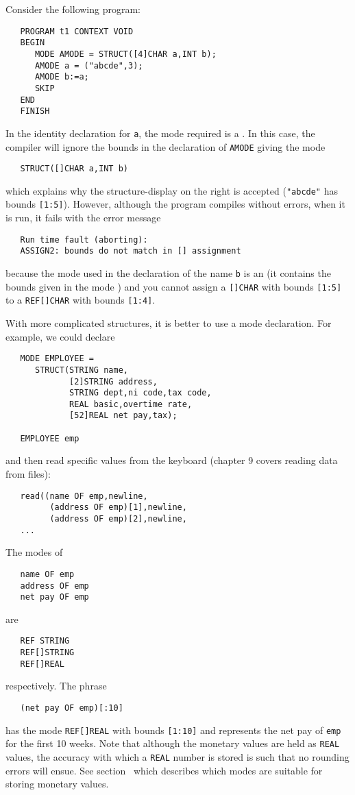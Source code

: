 Consider the following program:
\begin{verbatim}
   PROGRAM t1 CONTEXT VOID
   BEGIN
      MODE AMODE = STRUCT([4]CHAR a,INT b);
      AMODE a = ("abcde",3);
      AMODE b:=a;
      SKIP
   END
   FINISH
\end{verbatim}
\noindent
In the identity declaration for \verb|a|, the mode required is a
.  In this case, the
compiler will ignore the bounds in the declaration of \verb|AMODE|
giving the mode
\begin{verbatim}
   STRUCT([]CHAR a,INT b)
\end{verbatim}
\noindent
which explains why the structure-display on the right is accepted
(\verb|"abcde"| has bounds \verb|[1:5]|). However, although the
program compiles without errors, when it is run, it fails with the
error message
\begin{verbatim}
   Run time fault (aborting):
   ASSIGN2: bounds do not match in [] assignment
\end{verbatim}
\noindent
because the mode used in the declaration of the name \verb|b| is an
 (it contains the bounds given in the mode
) and you cannot assign a
\verb|[]CHAR| with bounds \verb|[1:5]| to a \verb|REF[]CHAR| with
bounds \verb|[1:4]|.

With more complicated structures, it is better to use a mode
declaration. For example, we could declare
\begin{verbatim}
   MODE EMPLOYEE =
      STRUCT(STRING name,
             [2]STRING address,
             STRING dept,ni code,tax code,
             REAL basic,overtime rate,
             [52]REAL net pay,tax);

   EMPLOYEE emp
\end{verbatim}
\noindent
and then read specific values from the keyboard (chapter 9 covers
reading data from files):
\begin{verbatim}
   read((name OF emp,newline,
         (address OF emp)[1],newline,
         (address OF emp)[2],newline,
   ...
\end{verbatim}
\noindent
The modes of
\begin{verbatim}
   name OF emp
   address OF emp
   net pay OF emp
\end{verbatim}
\noindent
are
\begin{verbatim}
   REF STRING
   REF[]STRING
   REF[]REAL
\end{verbatim}
\noindent
respectively. The phrase
\begin{verbatim}
   (net pay OF emp)[:10]
\end{verbatim}
\noindent
has the mode \verb|REF[]REAL| with bounds \verb|[1:10]| and
represents the net pay of \verb|emp| for the first 10 weeks. Note
that although the monetary values are held as \verb|REAL| values, the
accuracy with which a \verb|REAL| number is stored is such that no
rounding errors will ensue. See section~ which
describes which modes are suitable for storing monetary values.

